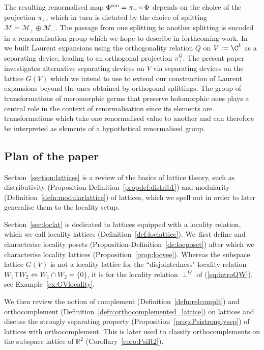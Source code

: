 \documentclass[10pt,a4paper]{amsart}
\numberwithin{equation}{section}
\newcommand{\R}{\mathbb{R}}
\newcommand{\loc}{locality\xspace}
\begin{document}
The resulting renormalised map $\Phi^{\rm ren}=\pi_+\circ \Phi$ depends on the choice of the projection $\pi_+$, which in turn is dictated by the choice of splitting $ {\mathcal M} = {\mathcal M}_+\oplus {\mathcal M}_-$. The passage from one splitting to another splitting is encoded in a renormalisation group which we hope to describe in forthcoming work. In~\cite{GPZ2} we built Laurent expansions using the orthogonality relation $Q$ on $V:=\C^k$ as a separating device, leading to an orthogonal projection $\pi_+^Q$. The present paper investigates alternative separating devices on $V $ via separating devices on the lattice $G(V)$ which we intend to use to extend our construction of Laurent expansions beyond the ones obtained by orthogonal splittings. The group of transformations of meromorphic germs that preserve holomorphic ones plays a central role in the context of renormalisation since its elements are transformations which take one renormalised value to another and can therefore be interpreted as elements of a hypothetical renormalised group.

\subsection{Plan of the paper}

Section~\ref{section:lattices} is a review of the basics of lattice theory, such as distributivity (Proposition-Defi\-ni\-tion~\ref{propdef:distrib1}) and modularity (Definition~\ref{defn:modularlattice}) of lattices, which we spell out in order to later generalise them to the locality setup.

Section~\ref{sec:loclat} is dedicated to lattices equipped with a locality relation, which we call locality lattices (Definition~\ref{def:loclattice}). We~first define and characterise locality posets (Proposition-Definition~\ref{de:locposet}) after which we characterise locality lattices (Proposition~\ref{prop:locvee}).
%
Whereas the subspace lattice $G(V)$ is not a
\loc lattice for the ``disjointedness" \loc relation $W_1\top W_2\Leftrightarrow W_1\cap W_2=\{0\}$, it is for the \loc relation
$\perp^Q$ of (\ref{eq:introQW}), see Example~\ref{ex:GVlocality}.

We then review the notion of complement (Definition~\ref{defn:relcomplt}) and orthocomplement (Definition~\ref{defn:orthocomplemented_lattice}) on lattices and discuss the strongly separating property (Proposition~\ref{prop:Psistronglysep}) of lattices with orthocomplement. This is later used to classify orthocomplements on the subspace lattice of $\R^2$ (Corollary~\ref{coro:PsiR2}).
\end{document}
